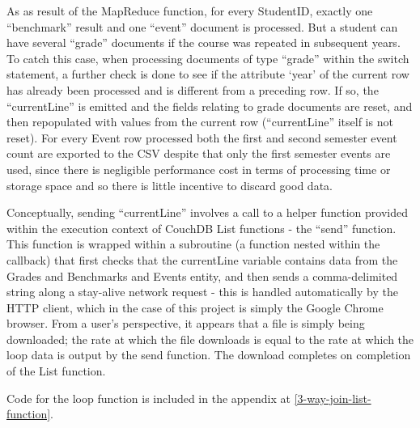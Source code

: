 As as result of the MapReduce function, for every StudentID, exactly one ``benchmark'' result and one ``event'' document is processed. But a student can have several ``grade'' documents if the course was repeated in subsequent years. To catch this case, when processing documents of type ``grade'' within the switch statement, a further check is done to see if the attribute `year' of the current row has already been processed and is different from a preceding row. If so, the ``currentLine'' is emitted and the fields relating to grade documents are reset, and then repopulated with values from the current row (``currentLine'' itself is not reset). For every Event row processed both the first and second semester event count are exported to the CSV despite that only the first semester events are used, since there is negligible performance cost in terms of processing time or storage space and so there is little incentive to discard good data.

Conceptually, sending ``currentLine'' involves a call to a helper function provided within the execution context of CouchDB List functions - the ``send'' function. This function is wrapped within a subroutine (a function nested within the callback) that first checks that the currentLine variable contains data from the Grades and Benchmarks and Events entity, and then sends a comma-delimited string along a stay-alive network request - this is handled automatically by the HTTP client, which in the case of this project is simply the Google Chrome browser. From a user's perspective, it appears that a file is simply being downloaded; the rate at which the file downloads is equal to the rate at which the loop data is output by the send function. The download completes on completion of the List function.

Code for the loop function is included in the appendix at \ref{3-way-join-list-function}.